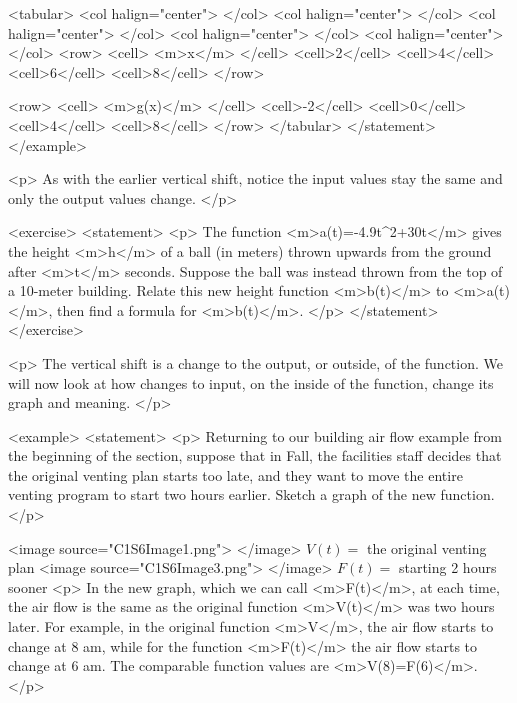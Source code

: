                 <tabular>
                    <col halign="center"> </col> <col halign="center"> </col> <col halign="center"> </col> <col halign="center"> </col> <col halign="center"> </col>
                    <row>
                        <cell> <m>x</m> </cell>
                        <cell>2</cell>
                        <cell>4</cell>
                        <cell>6</cell>
                        <cell>8</cell>
                    </row>

                    <row>
                        <cell> <m>g(x)</m> </cell>
                        <cell>-2</cell>
                        <cell>0</cell>
                        <cell>4</cell>
                        <cell>8</cell>
                    </row>
                </tabular>
            </statement>
        </example>

        <p>
            As with the earlier vertical shift, notice the input values stay the same and only the output values change.
        </p>

        <exercise>
            <statement>
                <p>
                    The function <m>a(t)=-4.9t^{2}+30t</m> gives the height <m>h</m> of a ball (in meters) thrown upwards from the ground after <m>t</m> seconds.
                    Suppose the ball was instead thrown from the top of a 10-meter building.
                    Relate this new height function <m>b(t)</m> to <m>a(t)</m>, then find a formula for <m>b(t)</m>.
                </p>
            </statement>
        </exercise>

        <p>
            The vertical shift is a change to the output, or outside, of the function.
            We will now look at how changes to input, on the inside of the function, change its graph and meaning.
        </p>

        <example>
            <statement>
                <p>
                    Returning to our building air flow example from the beginning of the section, suppose that in Fall, the facilities staff decides that the original venting plan starts too late, and they want to move the entire venting program to start two hours earlier.
                    Sketch a graph of the new function.
                </p>

                <image source="C1S6Image1.png">
                </image>
                $V(t)=$ the original venting plan
                <image source="C1S6Image3.png">
                </image>
                $F(t)=$ starting 2 hours sooner
                <p>
                    In the new graph, which we can call <m>F(t)</m>, at each time, the air flow is the same as the original function <m>V(t)</m> was two hours later.
                    For example, in the original function <m>V</m>, the air flow starts to change at 8 am, while for the function <m>F(t)</m> the air flow starts to change at 6 am.
                    The comparable function values are <m>V(8)=F(6)</m>.
                </p>

